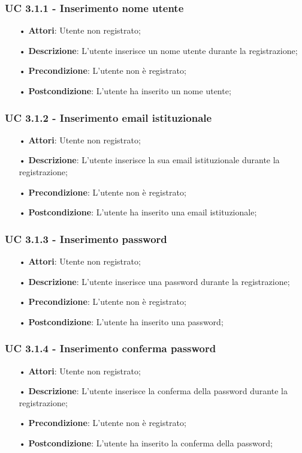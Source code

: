 \subsubsection{UC 3.1.1 - Inserimento nome utente}
\begin{itemize}
\item[•]\textbf{Attori}: Utente non registrato;
\item[•]\textbf{Descrizione}: L’utente inserisce un nome utente durante la registrazione;
\item[•]\textbf{Precondizione}: L’utente non è registrato;
\item[•]\textbf{Postcondizione}: L’utente ha inserito un nome utente;
\end{itemize}

\subsubsection{UC 3.1.2 - Inserimento email istituzionale}
\begin{itemize}
\item[•]\textbf{Attori}: Utente non registrato;
\item[•]\textbf{Descrizione}: L’utente inserisce la sua email istituzionale durante la registrazione;
\item[•]\textbf{Precondizione}: L’utente non è registrato;
\item[•]\textbf{Postcondizione}: L’utente ha inserito una email istituzionale;
\end{itemize}

\subsubsection{UC 3.1.3 - Inserimento password}
\begin{itemize}
\item[•]\textbf{Attori}: Utente non registrato;
\item[•]\textbf{Descrizione}: L’utente inserisce una password durante la registrazione;
\item[•]\textbf{Precondizione}: L’utente non è registrato;
\item[•]\textbf{Postcondizione}: L’utente ha inserito una password;
\end{itemize}

\subsubsection{UC 3.1.4 - Inserimento conferma password}
\begin{itemize}
\item[•]\textbf{Attori}: Utente non registrato;
\item[•]\textbf{Descrizione}: L’utente inserisce la conferma della password durante la registrazione;
\item[•]\textbf{Precondizione}: L’utente non è registrato;
\item[•]\textbf{Postcondizione}: L’utente ha inserito la conferma della password;
\end{itemize}

